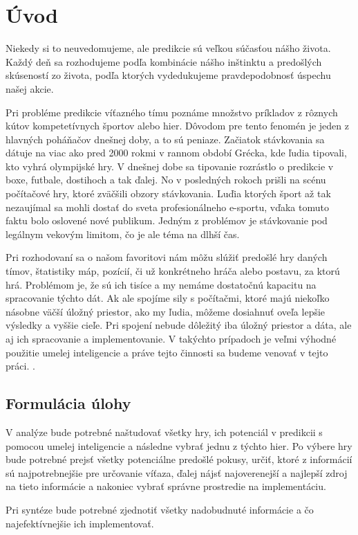 
{}

\chapter*{Úvod}


Niekedy si to neuvedomujeme, ale predikcie sú veľkou súčasťou nášho života. Každý deň sa rozhodujeme podľa kombinácie nášho inštinktu a predošlých skúseností zo života, podľa ktorých vydedukujeme pravdepodobnosť úspechu našej akcie.
 
Pri probléme predikcie víťazného tímu poznáme množstvo príkladov z rôznych kútov kompetetívnych športov alebo hier. Dôvodom pre tento fenomén je jeden z hlavných poháňačov dnešnej doby, a to sú peniaze. Začiatok stávkovania sa dátuje na viac ako pred 2000 rokmi v rannom období Grécka, kde ľudia tipovali, kto vyhrá olympijské hry. V dnešnej dobe sa tipovanie rozrástlo o predikcie v boxe, futbale, dostihoch a tak ďalej. No v posledných rokoch prišli na scénu počítačové hry, ktoré zväčšili obzory stávkovania. Luďia ktorých šport až tak nezaujímal sa mohli dostať do sveta profesionálneho e-sportu, vďaka tomuto faktu bolo oslovené nové publikum. Jedným z problémov je stávkovanie pod legálnym vekovým limitom, čo je ale téma na dlhší čas. 

Pri rozhodovaní sa o našom favoritovi nám môžu slúžiť predošlé hry daných tímov, štatistiky máp, pozícií, či už konkrétneho hráča alebo postavu, za ktorú hrá. Problémom je, že sú ich tisíce a my nemáme dostatočnú kapacitu na spracovanie týchto dát. Ak ale spojíme sily s počítačmi, ktoré majú niekoľko násobne väčší úložný priestor, ako my ľudia, môžeme dosiahnuť oveľa lepšie výsledky a vyššie cieľe. Pri spojení nebude dôležitý iba úložný priestor a dáta, ale aj ich spracovanie a implementovanie. V takýchto prípadoch je veľmi výhodné použitie umelej inteligencie a práve tejto činnosti sa budeme venovať v tejto práci. 
.


\section*{Formulácia úlohy}

V analýze bude potrebné naštudovať všetky hry, ich potenciál v predikcii s pomocou umelej inteligencie a následne vybrať jednu z týchto hier. Po výbere hry bude potrebné prejsť všetky potenciálne predošlé pokusy, určiť, ktoré z informácií sú najpotrebnejšie pre určovanie víťaza, ďalej nájsť najoverenejší a najlepší zdroj na tieto informácie a nakoniec vybrať správne prostredie na implementáciu.

Pri syntéze bude potrebné zjednotiť všetky nadobudnuté informácie a čo najefektívnejšie ich implementovať.
